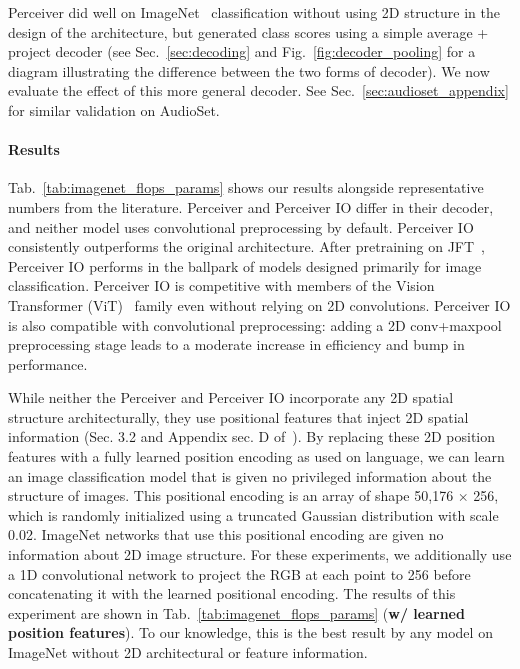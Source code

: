 \documentclass{article} %
\newcommand{\ourmodel}{Perceiver IO\xspace}
\begin{document}
Perceiver did well on ImageNet~\citep{deng2009imagenet} classification without using 2D structure in the design of the architecture, but generated class scores using a simple average + project decoder (see Sec.~\ref{sec:decoding} and Fig.~\ref{fig:decoder_pooling} for a diagram illustrating the difference between the two forms of decoder). We now evaluate the effect of this more general decoder. See Sec.~\ref{sec:audioset_appendix} for similar validation on AudioSet.

\paragraph{Results} Tab.~\ref{tab:imagenet_flops_params} shows our results alongside representative numbers from the literature. Perceiver and \ourmodel{} differ in their decoder, and neither model uses convolutional preprocessing by default. \ourmodel{} consistently outperforms the original architecture. After pretraining on JFT~\citep{sun2017revisiting}, \ourmodel{} performs in the ballpark of models designed primarily for image classification. \ourmodel{} is competitive with members of the Vision Transformer (ViT)~\citep{dosovitskiy2020image} family even without relying on 2D convolutions. \ourmodel{} is also compatible with convolutional preprocessing: adding a 2D conv+maxpool preprocessing stage leads to a moderate increase in efficiency and bump in performance.

While neither the Perceiver and \ourmodel{} incorporate any 2D spatial structure architecturally, they use positional features that inject 2D spatial information (Sec. 3.2 and Appendix sec. D of~\citealt{jaegle2021perceiver}). By replacing these 2D position features with a fully learned position encoding as used on language, we can learn an image classification model that is given no privileged information about the structure of images. This positional encoding is an array of shape 50,176 $\times$ 256, which is randomly initialized using a truncated Gaussian distribution with scale 0.02. ImageNet networks that use this positional encoding are given no information about 2D image structure. For these experiments, we additionally use a 1D convolutional network to project the RGB at each point to 256 before concatenating it with the learned positional encoding. The results of this experiment are shown in Tab.~\ref{tab:imagenet_flops_params} (\textbf{w/ learned position features}). To our knowledge, this is the best result by any model on ImageNet without 2D architectural or feature information.
\end{document}
